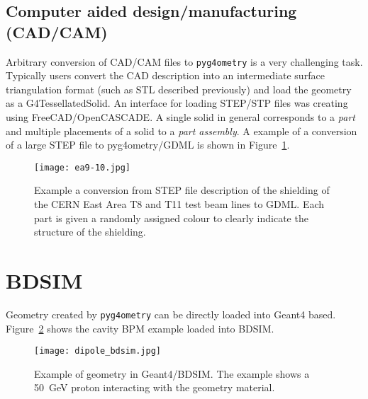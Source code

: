 \documentclass[a4paper,
               keeplastbox,   %
               ]{jacow}
\begin{document}
\subsection{Computer aided design/manufacturing (CAD/CAM)}
Arbitrary conversion of CAD/CAM files to \verb|pyg4ometry| is a very challenging task. Typically users convert the CAD description into
an intermediate surface triangulation format (such as STL described previously) and load the geometry as a G4TessellatedSolid. An interface for
loading STEP/STP files was creating using FreeCAD/OpenCASCADE. A single solid in general corresponds to a {\it part} and multiple placements 
of a solid to a {\it part assembly}.
A example of a conversion of a large STEP file to pyg4ometry/GDML is shown in Figure~\ref{fig:ea910}.
\begin{figure}[!htb]
   \centering
   \texttt{[image: ea9-10.jpg]}
   \caption{Example a conversion from STEP file description of the shielding of the CERN East Area T8 and T11 test beam lines to GDML. Each part is 
   given a randomly assigned colour to clearly indicate the structure of the shielding.}
   \label{fig:ea910}
\end{figure}


\section{BDSIM}
Geometry created by \verb|pyg4ometry| can be directly loaded into Geant4 based. Figure~\ref{fig:dipole-bdsim} shows the cavity BPM 
example loaded into BDSIM. 
\begin{figure}[h!tb]
   \centering
   \texttt{[image: dipole\_bdsim.jpg]}
   \caption{Example of geometry in Geant4/BDSIM. The example shows a 50~GeV proton interacting with the geometry material.}
   \label{fig:dipole-bdsim}
\end{figure}
\end{document}
